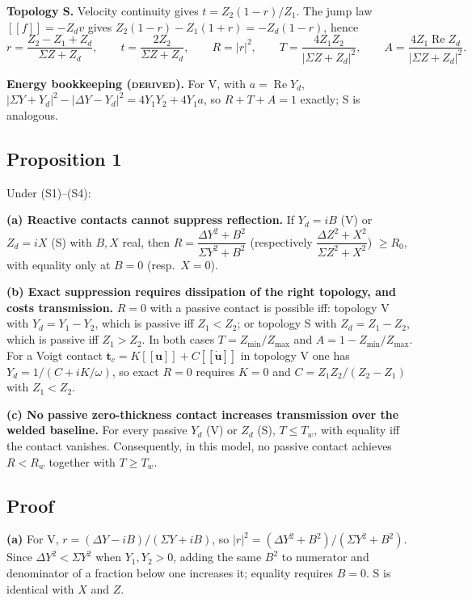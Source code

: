 \documentclass[11pt]{article}
\newcommand{\jj}{[\![}
\newcommand{\kk}{]\!]}
\begin{document}
\textbf{Topology S.} Velocity continuity gives $t=Z_2(1-r)/Z_1$. The jump law
$\jj f\kk=-Z_d v$ gives $Z_2(1-r)-Z_1(1+r)=-Z_d(1-r)$, hence
\begin{equation}
  r = \frac{Z_2-Z_1+Z_d}{\Sigma Z + Z_d}, \qquad
  t = \frac{2Z_2}{\Sigma Z+Z_d}, \qquad
  R = \lvert r\rvert^2, \qquad
  T = \frac{4Z_1Z_2}{\lvert\Sigma Z+Z_d\rvert^2}, \qquad
  A = \frac{4Z_1\operatorname{Re}Z_d}{\lvert\Sigma Z+Z_d\rvert^2}. \tag{10}
\end{equation}

\textbf{Energy bookkeeping (\textsc{derived}).} For V, with $a=\operatorname{Re}Y_d$,
$\lvert\Sigma Y+Y_d\rvert^2-\lvert\Delta Y-Y_d\rvert^2 = 4Y_1Y_2+4Y_1a$, so
$R+T+A=1$ exactly; S is analogous.

\subsection*{Proposition 1}
Under (S1)--(S4):

\noindent\textbf{(a) Reactive contacts cannot suppress reflection.} If $Y_d=iB$
(V) or $Z_d=iX$ (S) with $B,X$ real, then
$R = \dfrac{\Delta Y^2+B^2}{\Sigma Y^2+B^2}$
(respectively $\dfrac{\Delta Z^2+X^2}{\Sigma Z^2+X^2}$) $\ge R_0$, with equality
only at $B=0$ (resp.\ $X=0$).

\noindent\textbf{(b) Exact suppression requires dissipation of the right
topology, and costs transmission.} $R=0$ with a passive contact is possible iff:
topology V with $Y_d=Y_1-Y_2$, which is passive iff $Z_1<Z_2$; or topology S with
$Z_d=Z_1-Z_2$, which is passive iff $Z_1>Z_2$. In both cases
$T=Z_{\min}/Z_{\max}$ and $A=1-Z_{\min}/Z_{\max}$. For a Voigt contact
$\bm{t}_c=K\jj\bm{u}\kk+C\jj\dot{\bm{u}}\kk$ in topology V one has
$Y_d=1/(C+iK/\omega)$, so exact $R=0$ requires $K=0$ and
$C=Z_1Z_2/(Z_2-Z_1)$ with $Z_1<Z_2$.

\noindent\textbf{(c) No passive zero-thickness contact increases transmission over
the welded baseline.} For every passive $Y_d$ (V) or $Z_d$ (S), $T\le T_w$, with
equality iff the contact vanishes. Consequently, in this model, no passive
contact achieves $R<R_w$ together with $T\ge T_w$.

\subsection*{Proof}

\noindent\textbf{(a)} For V, $r=(\Delta Y-iB)/(\Sigma Y+iB)$, so
$\lvert r\rvert^2 = (\Delta Y^2+B^2)/(\Sigma Y^2+B^2)$. Since $\Delta Y^2<\Sigma Y^2$
when $Y_1,Y_2>0$, adding the same $B^2$ to numerator and denominator of a fraction
below one increases it; equality requires $B=0$. S is identical with $X$ and $Z$.
\end{document}
